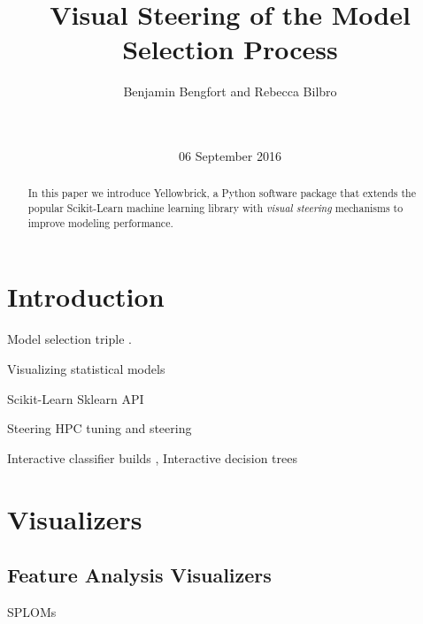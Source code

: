 \documentclass{sigkddExp}
\begin{document}
\title{Visual Steering of the Model Selection Process}


\author{
\alignauthor Benjamin Bengfort and Rebecca Bilbro \\
       \\
       \\
}

\additionalauthors{}

\date{06 September 2016}

\maketitle

\begin{abstract}
In this paper we introduce Yellowbrick, a Python software package that extends the popular Scikit-Learn machine learning library with \textit{visual steering} mechanisms to improve modeling performance.
\end{abstract}

\section{Introduction}

Model selection triple \cite{kumar_model_2015}.

Visualizing statistical models \cite{wickham_visualizing_2015}

Scikit-Learn \cite{pedregosa_scikit-learn:_2011} Sklearn API \cite{buitinck_api_2013}

Steering \cite{kapoor_interactive_2010}
HPC tuning and steering \cite{hollingsworth_end--end_2010,gu_falcon:_1995}

Interactive classifier builds \cite{ware_interactive_2001}, Interactive decision trees \cite{ankerst_visual_1999}

\section{Visualizers}

\subsection{Feature Analysis Visualizers}

SPLOMs \cite{wilkinson_graph-theoretic_2005}
\end{document}
